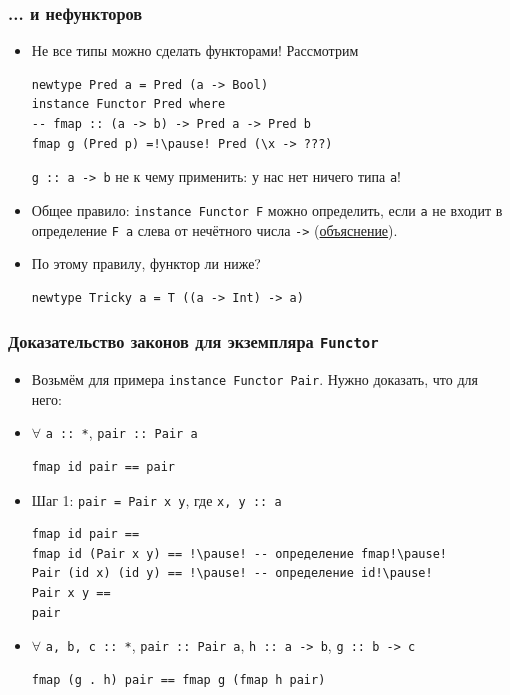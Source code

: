 \documentclass[11pt]{beamer}
\begin{document}
\begin{frame}[fragile]
\frametitle{... и нефункторов}
\begin{itemize}
    \item Не все типы можно сделать функторами! Рассмотрим     
\begin{lstlisting}
newtype Pred a = Pred (a -> Bool)
instance Functor Pred where 
-- fmap :: (a -> b) -> Pred a -> Pred b
fmap g (Pred p) =!\pause! Pred (\x -> ???)
\end{lstlisting}
    \pause \lstinline|g :: a -> b| не к чему применить: у нас нет ничего типа \lstinline|a|!
    \pause
    \item Общее правило: \lstinline|instance Functor F| можно определить, если \lstinline|a| не входит в определение \lstinline|F a| слева от нечётного числа \lstinline|->| (\href{https://downloads.haskell.org/~ghc/8.6.3/docs/html/users_guide/glasgow_exts.html#deriving-functor-instances}{объяснение}).
    \pause
    \item По этому правилу, функтор ли ниже?
\begin{lstlisting}
newtype Tricky a = T ((a -> Int) -> a)
\end{lstlisting}
\end{itemize}
\end{frame}

\begin{frame}[fragile]
\frametitle{Доказательство законов для экземпляра \lstinline|Functor|}
\begin{itemize}
    \item Возьмём для примера \lstinline|instance Functor Pair|. Нужно доказать, что для него:
    \item $\forall$ \lstinline|a :: *|, \lstinline|pair :: Pair a|
\begin{lstlisting}
fmap id pair == pair
\end{lstlisting}
    \pause
    \item Шаг 1: \lstinline|pair = Pair x y|, где \lstinline|x, y :: |\pause\lstinline|a|
\begin{lstlisting}
fmap id pair ==
fmap id (Pair x y) == !\pause! -- определение fmap!\pause!
Pair (id x) (id y) == !\pause! -- определение id!\pause!
Pair x y == 
pair
\end{lstlisting}
    \pause
    \item $\forall$ \lstinline|a, b, c :: *|, \lstinline|pair :: Pair a|, \lstinline|h :: a -> b|, \lstinline|g :: b -> c|
\begin{lstlisting}
fmap (g . h) pair == fmap g (fmap h pair)
\end{lstlisting}
\end{itemize}
\end{frame}
\end{document}
